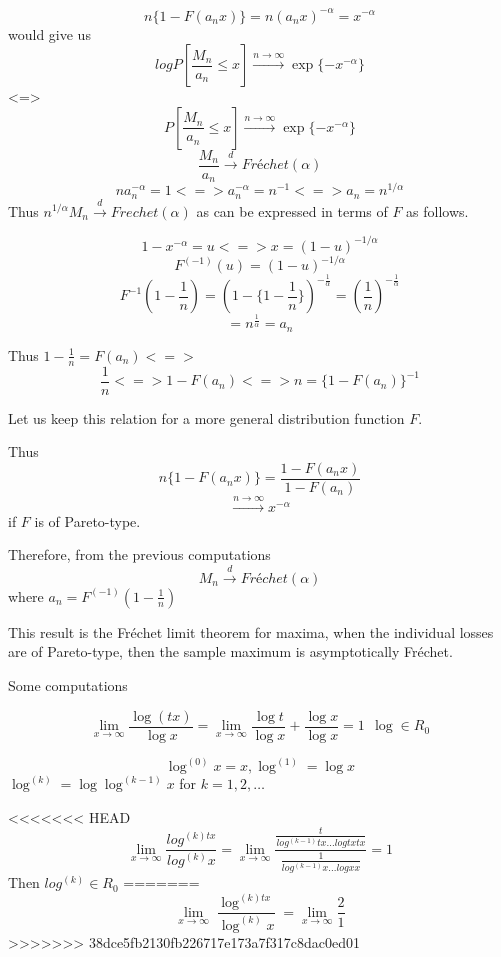 \documentclass[11pt,a4paper,oneside]{article}
\begin{document}
$$n\{1-F(a_nx)\}=n(a_nx)^{-\alpha}=x^{-\alpha}$$
would give us 
$$log P[\frac{M_n}{a_n}\leq x]\xrightarrow{n\rightarrow\infty}\exp\{-x^{-\alpha}\}$$
<=>
$$P[\frac{M_n}{a_n}\leq x]\xrightarrow{n\rightarrow\infty}\exp\{-x^{-\alpha}\}$$
$$\frac{M_n}{a_n}\xrightarrow{d} Fréchet(\alpha)$$
$$na_n^{-\alpha}=1<=>a_n^{-\alpha}=n^{-1}<=>a_n=n^{1/\alpha}$$
Thus $n^{1/\alpha}M_n\xrightarrow{d}Frechet(\alpha)$ as  can be expressed in terms of $F$ as follows.

$$1-x^{-\alpha}=u<=>x=(1-u)^{-1/\alpha}$$
$$F^{(-1)}(u)=(1-u)^{-1/\alpha}$$
$$F^{-1}(1-\frac{1}{n})=(1-\{1-\frac{1}{n}\})^{-\frac{1}{\alpha}}=(\frac{1}{n})^{-\frac{1}{\alpha}}$$
$$=n^{\frac{1}{\alpha}}=a_n$$

Thus $1-\frac{1}{n}=F(a_n)<=>$ $$\frac{1}{n}<=>1-F(a_n)<=>n=\{1-F(a_n)\}^{-1}$$

Let us keep this relation  for a more general distribution function $F$.

Thus
$$n\{1-F(a_nx)\}=\frac{1-F(a_nx)}{1-F(a_n)}$$
$$\xrightarrow{n\rightarrow\infty}x^{-\alpha}$$
if $F$ is of Pareto-type.

Therefore, from the previous computations
$$M_n\xrightarrow{d} Fréchet (\alpha)$$
where $a_n=F^{(-1)}(1-\frac{1}{n})$


This result is the Fréchet limit theorem for maxima, when the individual losses are of Pareto-type, then the sample  maximum is asymptotically Fréchet.

Some computations

$$\lim_{x\rightarrow\infty}\frac{\log(tx)}{\log x}=\lim_{x\rightarrow\infty}\frac{\log t}{\log x}+\frac{\log x}{\log x}=1\ \ \log \in R_0$$


$$\log^{(0)}x=x, \log^{(1)}=\log x$$
$\log^{(k)}=\log \log^{(k-1)}x$ for $k=1,2,\ldots$

<<<<<<< HEAD
$$\lim_{x\rightarrow\infty}\frac{log^{(k)tx}}{log^{(k)}x}
=\lim_{x\rightarrow\infty}\frac{\frac{t}{log^{(k-1)}tx...log tx tx}}{\frac{1}{log^{(k-1)}x...log x x}}=1$$
Then $log^{(k)}\in R_0$
=======
$$\lim_{x\rightarrow\infty}\frac{\log^{(k)tx}}{\log^{(k)}x}=\lim_{x\rightarrow\infty}\frac{2}{1}$$
>>>>>>> 38dce5fb2130fb226717e173a7f317c8dac0ed01
\end{document}
